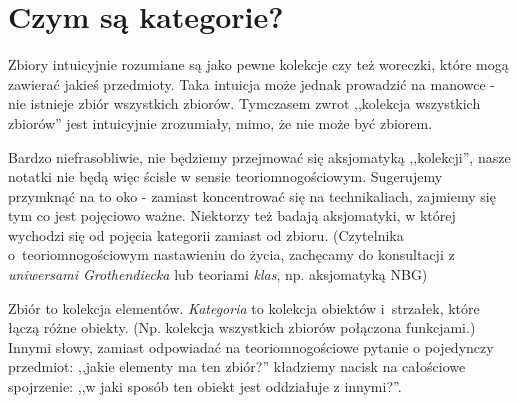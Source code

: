 \section{Czym są kategorie?}
\begin{remk}
  Zbiory intuicyjnie rozumiane są jako pewne kolekcje czy też woreczki, które mogą zawierać jakieś przedmioty. Taka intuicja może jednak prowadzić na manowce - nie istnieje zbiór wszystkich zbiorów. Tymczasem zwrot ,,kolekcja wszystkich zbiorów'' jest intuicyjnie zrozumiały, mimo, że nie może być zbiorem.

  Bardzo niefrasobliwie, nie będziemy przejmować się aksjomatyką ,,kolekcji'', nasze notatki nie będą więc ścisłe w sensie teoriomnogościowym. Sugerujemy przymknąć na to oko - zamiast koncentrować się na technikaliach, zajmiemy się tym co jest pojęciowo ważne. Niektorzy też badają aksjomatyki, w której wychodzi się od pojęcia kategorii zamiast od zbioru. (Czytelnika o~teoriomnogościowym nastawieniu do życia, zachęcamy do konsultacji z \emph{uniwersami Grothendiecka} lub teoriami \emph{klas}, np. aksjomatyką NBG)
\end{remk}

\begin{idea}
  Zbiór to kolekcja elementów. \emph{Kategoria} to kolekcja obiektów i~strzałek, które łączą różne obiekty. (Np. kolekcja wszystkich zbiorów połączona funkcjami.)
  Innymi słowy, zamiast odpowiadać na teoriomnogościowe pytanie o pojedynczy przedmiot: ,,jakie elementy ma ten zbiór?'' kładziemy nacisk na całościowe spojrzenie: ,,w jaki sposób ten obiekt jest oddziałuje z innymi?''.
\end{idea}

